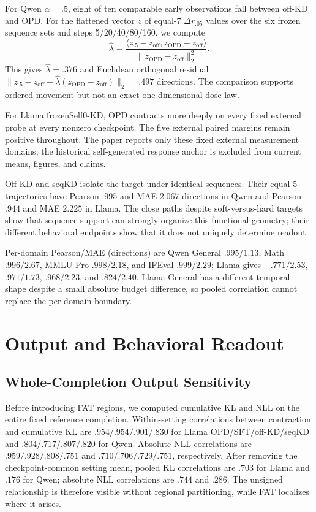 \documentclass[letterpaper]{article} %
\begin{document}
For Qwen $\alpha=.5$, eight of ten comparable early observations fall between off-KD and
OPD. For the flattened vector $z$ of equal-7 $\Delta r_{.05}$ values over the six frozen
sequence sets and steps 5/20/40/80/160, we compute
\begin{equation}
\widehat\lambda=
\frac{\langle z_{.5}-z_{\mathrm{off}},z_{\mathrm{OPD}}-z_{\mathrm{off}}\rangle}
{\|z_{\mathrm{OPD}}-z_{\mathrm{off}}\|_2^2}.
\end{equation}
This gives $\widehat\lambda=.376$ and Euclidean orthogonal residual
$\|z_{.5}-z_{\mathrm{off}}-\widehat\lambda
(z_{\mathrm{OPD}}-z_{\mathrm{off}})\|_2=.497$ directions. The comparison supports
ordered movement but not an exact one-dimensional dose law.

For Llama frozenSelf0-KD, OPD contracts more deeply on every fixed external probe at
every nonzero checkpoint. The five external paired margins remain positive throughout.
The paper reports only these fixed external measurement domains; the historical
self-generated response anchor is excluded from current means, figures, and claims.

Off-KD and seqKD isolate the target under identical sequences. Their equal-5 trajectories
have Pearson $.995$ and MAE $2.067$ directions in Qwen and Pearson $.944$ and MAE
$2.225$ in Llama. The close paths despite soft-versus-hard targets show that sequence
support can strongly organize this functional geometry; their different behavioral
endpoints show that it does not uniquely determine readout.

Per-domain Pearson/MAE (directions) are Qwen General $.995/1.13$, Math $.996/2.67$,
MMLU-Pro $.998/2.18$, and IFEval $.999/2.29$; Llama gives $-.771/2.53$,
$.971/1.73$, $.968/2.23$, and $.824/2.40$. Llama General has a different temporal
shape despite a small absolute budget difference, so pooled correlation cannot replace
the per-domain boundary.

\section{Output and Behavioral Readout}

\subsection{Whole-Completion Output Sensitivity}

Before introducing FAT regions, we computed cumulative KL and NLL on the entire fixed
reference completion. Within-setting correlations between contraction and cumulative KL are
$.954/.954/.901/.830$ for Llama OPD/SFT/off-KD/seqKD and
$.804/.717/.807/.820$ for Qwen. Absolute NLL correlations are
$.959/.928/.808/.751$ and $.710/.706/.729/.751$, respectively. After removing the
checkpoint-common setting mean, pooled KL correlations are $.703$ for Llama and $.176$ for
Qwen; absolute NLL correlations are $.744$ and $.286$. The unsigned relationship is
therefore visible without regional partitioning, while FAT localizes where it arises.
\end{document}
